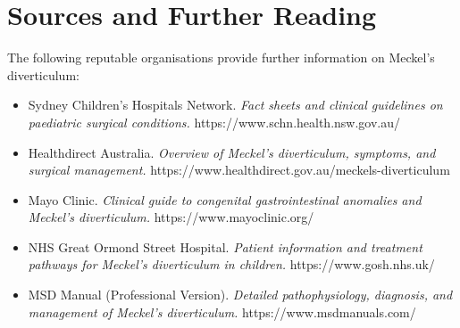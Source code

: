 \section*{Sources and Further Reading}
The following reputable organisations provide further information on Meckel's diverticulum:
\begin{itemize}
    \item Sydney Children's Hospitals Network. \textit{Fact sheets and clinical guidelines on paediatric surgical conditions.} https://www.schn.health.nsw.gov.au/
    \item Healthdirect Australia. \textit{Overview of Meckel's diverticulum, symptoms, and surgical management.} https://www.healthdirect.gov.au/meckels-diverticulum
    \item Mayo Clinic. \textit{Clinical guide to congenital gastrointestinal anomalies and Meckel's diverticulum.} https://www.mayoclinic.org/
    \item NHS Great Ormond Street Hospital. \textit{Patient information and treatment pathways for Meckel's diverticulum in children.} https://www.gosh.nhs.uk/
    \item MSD Manual (Professional Version). \textit{Detailed pathophysiology, diagnosis, and management of Meckel's diverticulum.} https://www.msdmanuals.com/
\end{itemize}
